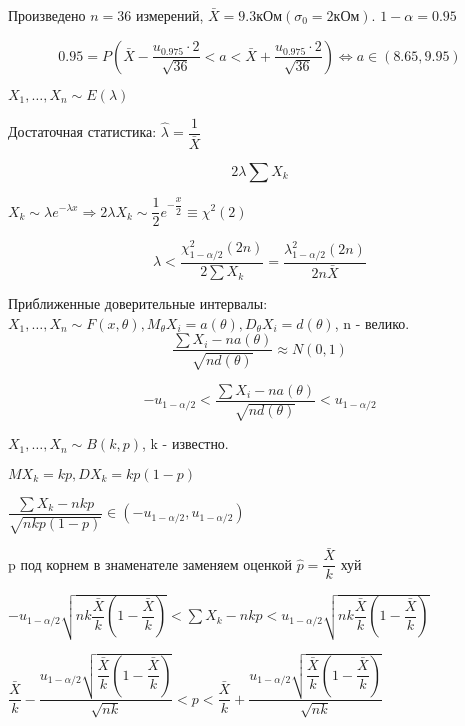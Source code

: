 \begin{ex}
  Произведено $n=36$ измерений, $\bar X = 9.3 \text{кОм} (\sigma_0 = 2 \text{кОм})$.
$1- \alpha = 0.95$

\[
  0.95 = P\left(\bar X - \dfrac{u_{0.975} \cdot 2}{\sqrt{36}} < a < \bar X + \dfrac{u_{0.975} \cdot 2}{\sqrt{36}}\right) \Leftrightarrow a \in (8.65, 9.95)
\]
\end{ex}

\begin{ex}
  $X_1, \dots, X_n \sim E(\lambda)$

  Достаточная статистика: $\hat \lambda = \dfrac{1}{\bar X}$

  $$2\lambda \sum X_k$$

  $X_k \sim \lambda e^{-\lambda x} \Rightarrow 2\lambda X_k \sim \dfrac{1}{2} e^{-\dfrac{x}{2}} \equiv \chi^2 (2)$

  $$\lambda < \dfrac{\chi^2_{1-\alpha/2} (2n)}{2 \sum X_k} = \dfrac{\lambda^2_{1-\alpha/2} (2n)}{2n \bar X}$$
\end{ex}

  Приближенные доверительные интервалы:
  $X_1, \dots, X_n \sim F(x, \theta), M_\theta X_i = a(\theta), D_\theta X_i = d(\theta)$, n - велико. 
  $$\dfrac{\sum X_i - n a(\theta)}{\sqrt{n d(\theta)}} \approx N(0, 1)$$

  $$- u_{1 - \alpha/2} < \dfrac{\sum X_i - n a(\theta)}{\sqrt{n d(\theta)}}< u_{1-\alpha/2}$$

\begin{ex}
  $X_1, \dots, X_n \sim B(k, p)$, k - известно.

  $M X_k = kp, D X_k = k p (1-p)$

  $\dfrac{\sum X_k - n k p}{\sqrt{nkp(1-p)}} \in (-u_{1-\alpha/2}, u_{1-\alpha/2})$

  p под корнем в знаменателе заменяем оценкой $\hat p = \dfrac{\bar X}{k}$ хуй

  $-u_{1-\alpha/2} \sqrt{nk \dfrac{\bar X}{k} (1 - \dfrac{\bar X}{k})} < \sum X_k - nkp < u_{1-\alpha/2} \sqrt{nk \dfrac{\bar X}{k} (1 - \dfrac{\bar X}{k})}$

  $\dfrac{\bar X}{k} - \dfrac{u_{1-\alpha/2} \sqrt{\dfrac{\bar X}{k} (1 - \dfrac{\bar X}{k})}}{\sqrt{nk}} < p < \dfrac{\bar X}{k} + \dfrac{u_{1-\alpha/2} \sqrt{\dfrac{\bar X}{k} (1 - \dfrac{\bar X}{k})}}{\sqrt{nk}}$
\end{ex}
